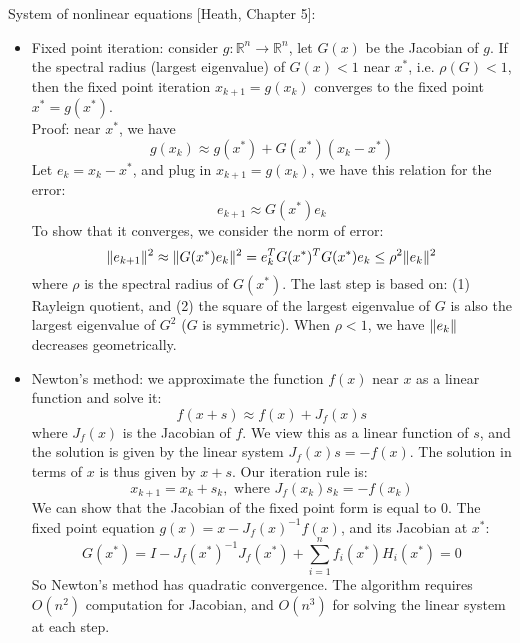 \documentclass{report}
\begin{document}
System of nonlinear equations [Heath, Chapter 5]: 
\begin{itemize}
	\item Fixed point iteration: consider $g: \mathbb{R}^n \to \mathbb{R}^n$, let $G(x)$ be the Jacobian of $g$. If the spectral radius (largest eigenvalue) of $G(x) < 1$ near $x^*$, i.e. $\rho(G) < 1$, then the fixed point iteration $x_{k+1} = g(x_k)$ converges to the fixed point $x^* = g(x^*)$. \\
	Proof: near $x^*$, we have 
	\begin{equation}
	g(x_k) \approx g(x^*) + G(x^*) (x_k - x^*)
	\end{equation}
	Let $e_k = x_k - x^*$, and plug in $x_{k+1}= g(x_k)$, we have this relation for the error: 
	\begin{equation}
	e_{k+1} \approx G(x^*) e_k
	\end{equation}
	To show that it converges, we consider the norm of error: 
	\begin{equation}
	\lVert e_{k+1}\rVert^2 \approx \lVert G(x^*) e_k\rVert^2 = e_k^T G(x^*)^T G(x^*) e_k \leq \rho^2 \lVert e_k\rVert^2
	\end{equation}
	where $\rho$ is the spectral radius of $G(x^*)$. The last step is based on: (1) Rayleign quotient, and (2) the square of the largest eigenvalue of $G$ is also the largest eigenvalue of $G^2$ ($G$ is symmetric). When $\rho < 1$, we have $\lVert e_k\rVert$ decreases geometrically. 
	
	\item Newton's method: we approximate the function $f(x)$ near $x$ as a linear function and solve it: 
	\begin{equation}
	f(x + s) \approx f(x) + J_f(x) s
	\end{equation}
	where $J_f(x)$ is the Jacobian of $f$. We view this as a linear function of $s$, and the solution is given by the linear system $J_f(x) s = - f(x)$. The solution in terms of $x$ is thus given by $x + s$. Our iteration rule is: 
	\begin{equation}
	x_{k+1} = x_k + s_k, \text{ where } J_f(x_k) s_k = -f(x_k)
	\end{equation}
	We can show that the Jacobian of the fixed point form is equal to 0. The fixed point equation $g(x) = x - J_f(x)^{-1} f(x)$, and its Jacobian at $x^*$: 
	\begin{equation}
	G(x^*) = I - J_f(x^*)^{-1} J_f(x^*) + \sum_{i=1}^n f_i(x^*) H_i(x^*) = 0
	\end{equation}
	So Newton's method has quadratic convergence. The algorithm requires $O(n^2)$ computation for Jacobian, and $O(n^3)$ for solving the linear system at each step.
	

\end{itemize}
\end{document}
